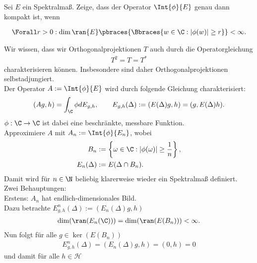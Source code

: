 \begin{exercise}[34/1]

Sei $E$ ein Spektralmaß.
Zeige, dass der Operator $\Int{\phi}{E}$ genau dann kompakt ist, wenn

\begin{align*}
  \Forall r > 0:
  \dim{\ran{E}}
  \pbraces
  {
    \Bbraces
    {
      w \in \C:
      |\phi(w)| \geq r
    }
  }
  < \infty.
\end{align*}

\end{exercise}

\begin{solution}



Wir wissen, dass wir Orthogonalprojektionen $T$ auch durch die Operatorgleichung
\begin{align*}
  T^2 = T = T^*
\end{align*}
charakterisieren können. Insbesondere sind daher Orthogonalprojektionen selbstadjungiert. \\
Der Operator $A := \Int{\phi}{E}$ wird durch folgende Gleichung charakterisiert:
\begin{align}
  \left(Ag,h\right) = \int_{\C}\phi dE_{g,h}, \qquad E_{g,h}(\Delta) := (E(\Delta)g,h) = (g,E(\Delta)h).
\end{align}
$\phi: \C \to \C$ ist dabei eine beschränkte, messbare Funktion. \\
Approximiere $A$ mit $A_n := \Int{\phi}{E_n}$, wobei
\begin{align*}
  B_n &:= \left\{\omega \in \C: |\phi(\omega)| \geq \frac{1}{n}\right\}, \\
  E_n(\Delta) &:= E(\Delta \cap B_n).
\end{align*}
Damit wird für $n \in \N$ beliebig klarerweise wieder ein Spektralmaß definiert. \\
Zwei Behauptungen: \\
Erstens: $A_n$ hat endlich-dimensionales Bild. \\
Dazu betrachte $E_{g,h}^n(\Delta) := (E_n(\Delta)g,h)$
\begin{align*}
  \dim (\ran(E_n(\C))) = \dim (\ran(E(B_n))) < \infty.
\end{align*}
Nun folgt für alle $g \in \ker(E(B_n))$
\begin{align*}
  E_{g,h}^n(\Delta) = (E_n(\Delta)g,h) = (0,h) = 0
\end{align*}
und damit für alle $h \in \mathcal{H}$

\end{solution}
